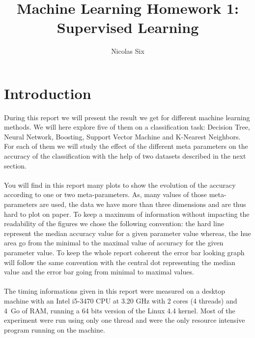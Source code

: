 \documentclass[twocolumn,a4paper,10pt]{article}
\title{Machine Learning Homework 1:\\Supervised Learning}
\author{Nicolas Six}
\begin{document}
\maketitle \tableofcontents{}

\section{Introduction}

\paragraph{}

During this report we will present the result we get for different
machine learning methods. We will here explore five of them on a classification
task: Decision Tree, Neural Network, Boosting, Support Vector Machine
and K-Nearest Neighbors. For each of them we will study the effect
of the different meta parameters on the accuracy of the classification
with the help of two datasets described in the next section.

\paragraph{}

You will find in this report many plots to show the evolution of the
accuracy according to one or two meta-parameters. As, many values
of those meta-parameters are used, the data we have more than three
dimensions and are thus hard to plot on paper. To keep a maximum of
information without impacting the readability of the figures we chose
the following convention: the hard line represent the median accuracy
value for a given parameter value whereas, the hue area go from the
minimal to the maximal value of accuracy for the given parameter value.
To keep the whole report coherent the error bar looking graph will
follow the same convention with the central dot representing the median
value and the error bar going from minimal to maximal values.

\paragraph{}

The timing informations given in this report were measured on a desktop
machine with an Intel i5-3470 CPU at 3.20 GHz with 2 cores (4 threads)
and 4~Go of RAM, running a 64 bits version of the Linux 4.4 kernel.
Most of the experiment were run using only one thread and were the
only resource intensive program running on the machine.
\end{document}
